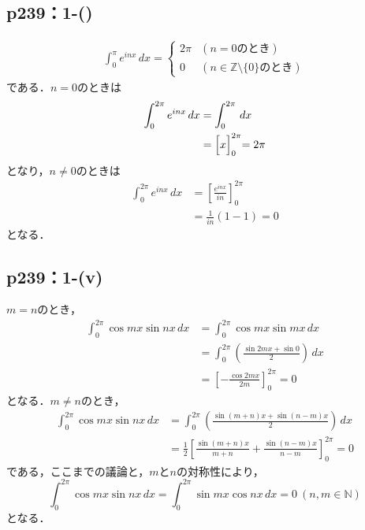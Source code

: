 \documentclass[a4paper,10pt,fleqn]{ltjsarticle}
\begin{document}
\subsection*{p239：1-()}
\begin{screen}
    \begin{align*}
        \int_{0}^{\pi} e^{inx} \, dx  =
        \begin{cases}
            2 \pi & (n=0 のとき)                             \\
            0     & (n \in \mathbb{Z}\setminus \{0\} のとき)
        \end{cases}
    \end{align*}
    である．$n=0$のときは
    \begin{align*}
        \int_{0}^{2 \pi} e^{inx} \, dx & = \int_{0}^{2\pi} \, dx           \\
                                       & = \Bigl[x\Bigl]_{0}^{2\pi} = 2\pi
    \end{align*}
    となり，$n \ne 0$のときは
    \begin{align*}
        \int_{0}^{2\pi} e^{inx} \, dx & = \left [\frac{e^{inx}}{in} \right ]_{0}^{2\pi} \\
                                      & = \frac{1}{in} (1-1)=0
    \end{align*}
    となる．
\end{screen}


\subsection*{p239：1-(v)}

\begin{screen}
    $m=n$のとき，
    \begin{align*}
        \int_{0}^{2\pi} \cos m x \sin nx \, dx & = \int_{0}^{2\pi} \cos mx \sin mx \, dx                            \\
                                               & = \int_{0}^{2\pi} \left (\frac{\sin 2mx + \sin 0}{2}\right ) \, dx \\
                                               & = \left [-\frac{\cos 2mx}{2m}\right ]_{0}^{2\pi} =0
    \end{align*}
    となる．$m \ne n$のとき，
    \begin{align*}
        \int_{0}^{2\pi} \cos mx \sin nx \, dx & = \int_{0}^{2\pi} \left (\frac{\sin (m+n)x + \sin (n-m)x}{2}\right) \, dx                 \\
                                              & = \frac{1}{2}\left [\frac{\sin (m+n)x}{m+n}+\frac{\sin (n-m)x}{n-m} \right]_{0}^{2\pi} =0
    \end{align*}
    である，ここまでの議論と，$m$と$n$の対称性により，
    \[
        \int_{0}^{2\pi} \cos mx \sin nx \, dx =\int_{0}^{2\pi} \sin mx \cos nx \, dx =0 ~(n,m \in \mathbb{N})
    \]
    となる．
\end{screen}
\end{document}
